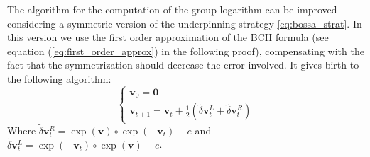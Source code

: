 The algorithm for the computation of the group logarithm can be improved considering a symmetric version of the underpinning strategy \ref{eq:bossa_strat}. In this version we use the first order approximation of the BCH formula (see equation (\ref{eq:first_order_approx}) in the following proof), compensating with the fact that the symmetrization should decrease the error involved.
It gives birth to the following algorithm:
\begin{equation}\label{eq:sym_strategy}
\begin{cases}
\mathbf{v}_0 = \mathbf{0} \\
\mathbf{v}_{t+1} = \mathbf{v}_{t} + \frac{1}{2}(\tilde{\delta} \mathbf{v}^{L}_{t} +\tilde{\delta} \mathbf{v}^{R}_{t})
\end{cases}
\end{equation}
Where $\tilde{\delta} \mathbf{v}^{R}_{t} = \exp(\mathbf{v})\circ \exp(- \mathbf{v}_{t}) - e$ and $\tilde{\delta} \mathbf{v}^{L}_{t} = \exp(-\mathbf{v}_{t})\circ \exp(\mathbf{v}) - e$.\\
